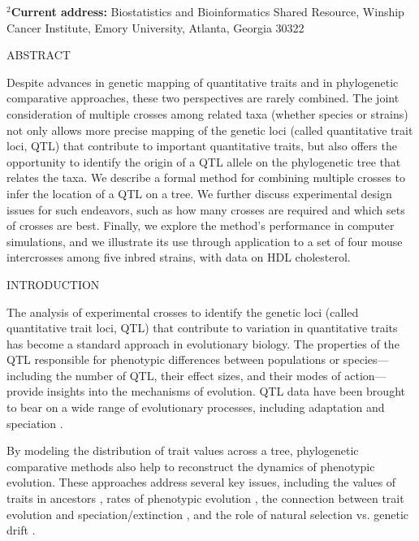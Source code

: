 \documentclass[12pt,letterpaper]{article}
\begin{document}
\bigskip \bigskip \bigskip

\noindent \textbf{$^2$Current address:} Biostatistics and
Bioinformatics Shared Resource, Winship Cancer Institute, Emory
University, Atlanta, Georgia 30322


\newpage



\centerline{ABSTRACT} 
  
Despite advances in genetic mapping of quantitative traits and in
phylogenetic comparative approaches, these two perspectives are rarely
combined.
The joint consideration of multiple crosses among related taxa
(whether species or strains) not only allows more precise mapping of
the genetic loci (called quantitative trait loci, QTL) that contribute
to important quantitative traits, but also offers the opportunity to
identify the origin of a QTL allele on the phylogenetic tree that
relates the taxa.  We describe a formal method for combining
multiple crosses to infer the location of a QTL on a tree.  We further
discuss experimental design issues for such endeavors,
such as how many crosses are required and which sets of crosses are
best. Finally, we explore the method's performance in computer
simulations, and we
illustrate its use through application to a set of four mouse
intercrosses among five inbred strains, with data on HDL cholesterol.


\newpage
\centerline{INTRODUCTION}

The analysis of experimental crosses to identify the genetic loci
(called quantitative trait loci, QTL) that contribute to variation in
quantitative traits has become a standard approach in evolutionary
biology. The properties of the QTL responsible for phenotypic
differences between populations or species---including the number of
QTL, their effect sizes, and their modes of action---provide insights
into the mechanisms of evolution. QTL data have been brought to bear
on a wide range of evolutionary processes, including adaptation
\citep{Doebley1991, Bradshaw1998, Orr1998, Mauricio2001, Peichel2001,
  Rieseberg2002, MitchellOlds2007, Steiner2007, Hall2010} and
speciation \citep{Bradshaw1995, Moehring2006, Oka2007, Shaw2007,
  Moyle2008, McDermott2011, White2011}.

By modeling the distribution of trait values across a tree,
phylogenetic comparative methods also help to reconstruct the dynamics
of phenotypic evolution. These approaches address several key issues,
including the values of traits in ancestors \citep{Schluter1997,
Pagel1999, Garland2000, Pagel2004}, rates of
phenotypic evolution \citep{Garland1992, Venditti2011}, the
connection between trait evolution and speciation/extinction
\citep{Maddison2007, Fitzjohn2009}, and the role of natural selection
vs. genetic drift \citep{Hansen1997, Freckleton2006}.
\end{document}
